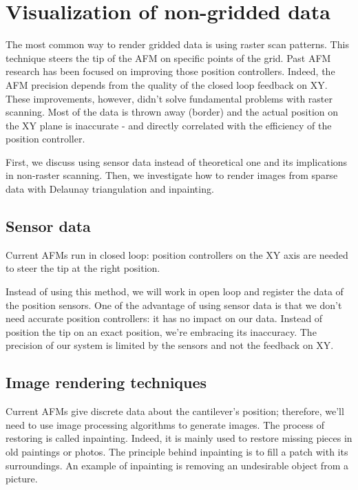 \chapter{Visualization of non-gridded data}

The most common way to render gridded data is using raster scan patterns. This technique steers the tip of the AFM on specific points of the grid. Past AFM research has been focused on improving those position controllers. Indeed, the AFM precision depends from the quality of the closed loop feedback on XY. These improvements, however, didn't solve fundamental problems with raster scanning. Most of the data is thrown away (border) and the actual position on the XY plane is inaccurate - and directly correlated with the efficiency of the position controller.

First, we discuss using sensor data instead of theoretical one and its implications in non-raster scanning. Then, we investigate how to render images from sparse data with Delaunay triangulation and inpainting. 

\section{Sensor data}
 
Current AFMs run in closed loop: position controllers on the XY axis are needed to steer the tip at the right position. 

Instead of using this method, we will work in open loop and register the data of the position sensors. One of the advantage of using sensor data is that we don't need accurate position controllers: it has no impact on our data. Instead of position the tip on an exact position, we're embracing its inaccuracy. The precision of our system is limited by the sensors and not the feedback on XY.

\section{Image rendering techniques}

Current AFMs give discrete data about the cantilever's position; therefore, we'll need to use image processing algorithms to generate images. The process of restoring is called inpainting. Indeed, it is mainly used to restore missing pieces in old paintings or photos. The principle behind inpainting is to fill a patch with its surroundings. An example of inpainting is removing an undesirable object from a picture. 

